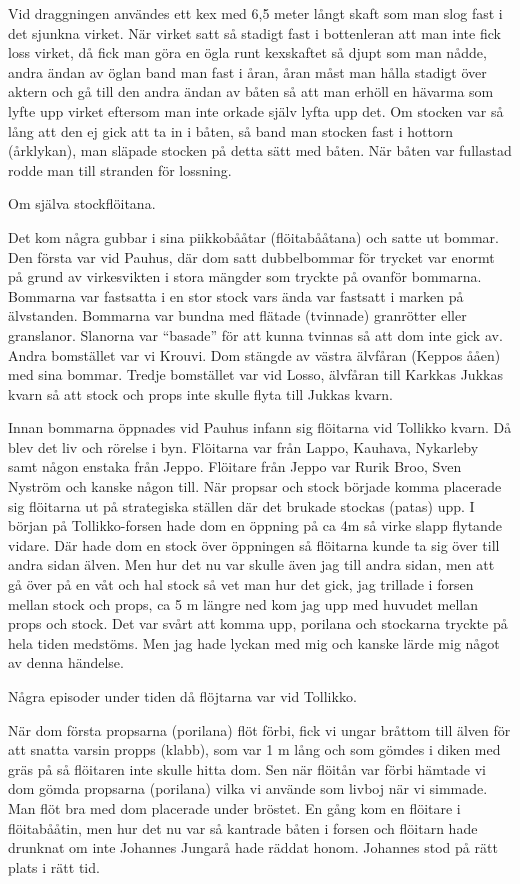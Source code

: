 Vid draggningen användes ett kex med 6,5 meter långt skaft som man slog fast i det sjunkna virket. När virket satt så stadigt fast i bottenleran att man inte fick loss virket, då fick man göra en ögla runt kexskaftet så djupt som man nådde, andra ändan av öglan band man fast i åran, åran måst man hålla stadigt över aktern och gå till den andra ändan av båten så att man erhöll en hävarma som lyfte upp virket eftersom man inte orkade själv lyfta upp det. Om stocken var så lång att den ej gick att ta in i båten, så band man stocken fast i hottorn (årklykan), man släpade stocken på detta sätt med båten. När båten var fullastad rodde man till stranden för lossning.


Om själva stockflöitana.

Det kom några gubbar i sina piikkobååtar (flöitabååtana) och satte ut bommar. Den första var vid Pauhus, där dom satt dubbelbommar för trycket var enormt på grund av virkesvikten i stora mängder som tryckte på ovanför bommarna. Bommarna var fastsatta i en stor stock vars ända var fastsatt i marken på älvstanden. Bommarna var bundna med flätade (tvinnade) granrötter eller granslanor. Slanorna var ``basade'' för att kunna tvinnas så att dom inte gick av. Andra bomstället var vi Krouvi. Dom stängde av västra älvfåran (Keppos ååen) med sina bommar. Tredje bomstället var vid Losso, älvfåran till Karkkas Jukkas kvarn så att stock och props inte skulle flyta till Jukkas kvarn.

Innan bommarna öppnades vid Pauhus infann sig flöitarna vid Tollikko kvarn. Då blev det liv och rörelse i byn. Flöitarna var från Lappo, Kauhava, Nykarleby samt någon enstaka från Jeppo. Flöitare från Jeppo var Rurik Broo, Sven Nyström och kanske någon till. När propsar och stock började komma placerade sig flöitarna ut på strategiska ställen där det brukade stockas (patas) upp. I början på Tollikko-forsen hade dom en öppning på ca 4m så virke slapp flytande vidare. Där hade dom en stock över öppningen så flöitarna kunde ta sig över till andra sidan älven. Men hur det nu var skulle även jag till andra sidan, men att gå över på en våt och hal stock så vet man hur det gick, jag trillade i forsen mellan stock och props, ca 5 m längre ned kom jag upp med huvudet mellan props och stock. Det var svårt att komma upp, porilana och stockarna tryckte på hela tiden medstöms. Men jag hade lyckan med mig och kanske lärde mig något av denna händelse.


Några episoder under tiden då flöjtarna var vid Tollikko.

När dom första propsarna (porilana) flöt förbi, fick vi ungar bråttom till älven för att snatta varsin propps (klabb), som var 1 m lång och som gömdes i diken med gräs på så flöitaren inte skulle hitta dom. Sen när flöitån var förbi hämtade vi dom gömda propsarna (porilana) vilka vi använde som livboj när vi simmade. Man flöt bra med dom placerade under bröstet. En gång kom en flöitare i flöitabååtin, men hur det nu var så kantrade båten i forsen och flöitarn hade drunknat om inte Johannes Jungarå hade räddat honom. Johannes stod på rätt plats i rätt tid.

